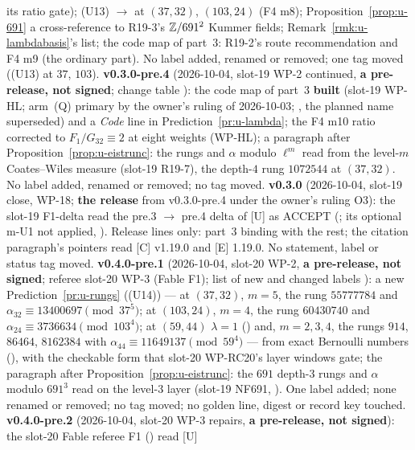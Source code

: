 \documentclass[11pt]{article}
\begin{document}
its ratio gate); (U13) \CONJ{} $\to$ \PROVED{} at $(37,32)$, $(103,24)$ (F4 m8); Proposition~\ref{prop:u-691} a cross-reference to R19-3's $\mathbb{Z}/691^{2}$ Kummer fields;
Remark~\ref{rmk:u-lambdabasis}'s \COMP{} list; the code map of part~3: R19-2's route recommendation and F4 m9 (the ordinary part). No label added, renamed or removed;
one tag moved ((U13) at $37$, $103$).
\textbf{v0.3.0-pre.4} (2026-10-04, slot-19 WP-2 continued, \textbf{a pre-release, not signed}; change table ): the code
map of part~3 \textbf{built} (slot-19 WP-HL; arm~(Q) primary by the owner's ruling of 2026-10-03; , the planned name superseded) and a \emph{Code} line in
Prediction~\ref{pr:u-lambda}; the F4 m10 ratio corrected to $F_1/G_{32}\equiv2$ at eight weights (WP-HL); a \COMP{} paragraph after Proposition~\ref{prop:u-eistrunc}: the rungs and
$\alpha$ modulo $\ell^{m}$ read from the level-$m$ Coates--Wiles measure (slot-19 R19-7), the depth-$4$ rung $1072544$ at $(37,32)$. No label added, renamed or removed; no tag moved.
\textbf{v0.3.0} (2026-10-04, slot-19 close, WP-18; \textbf{the release} from v0.3.0-pre.4 under the owner's ruling O3): the slot-19 F1-delta read the pre.3 $\to$ pre.4 delta of [U]
as ACCEPT (; its optional m-U1 not applied, ). Release lines
only: part~3 binding with the rest; the citation paragraph's pointers read [C] v1.19.0 and [E] 1.19.0. No statement, label or status tag moved.
\textbf{v0.4.0-pre.1} (2026-10-04, slot-20 WP-2, \textbf{a pre-release, not signed}; referee slot-20 WP-3 (Fable F1); list of new and changed labels
): a new Prediction~\ref{pr:u-rungs} ((U14)) --- at $(37,32)$, $m=5$, the rung $55777784$ and $\alpha_{32}\equiv13400697\pmod{37^{5}}$; at
$(103,24)$, $m=4$, the rung $60430740$ and $\alpha_{24}\equiv3736634\pmod{103^{4}}$; at $(59,44)$ $\lambda=1$ (\COMP) and, $m=2,3,4$, the rungs $914$, $86464$, $8162384$ with
$\alpha_{44}\equiv11649137\pmod{59^{4}}$ --- \PROVED{} from exact Bernoulli numbers (), with the checkable form that slot-20 WP-RC20's layer
windows gate; the paragraph after Proposition~\ref{prop:u-eistrunc}: the $691$ depth-$3$ rungs and $\alpha$ modulo $691^{3}$ read on the level-$3$ layer (slot-19 NF691, \COMP). One label added;
none renamed or removed; no tag moved; no golden line, digest or record key touched.
\textbf{v0.4.0-pre.2} (2026-10-04, slot-20 WP-3 repairs, \textbf{a pre-release, not signed}): the slot-20 Fable referee F1 () read [U]
\end{document}
